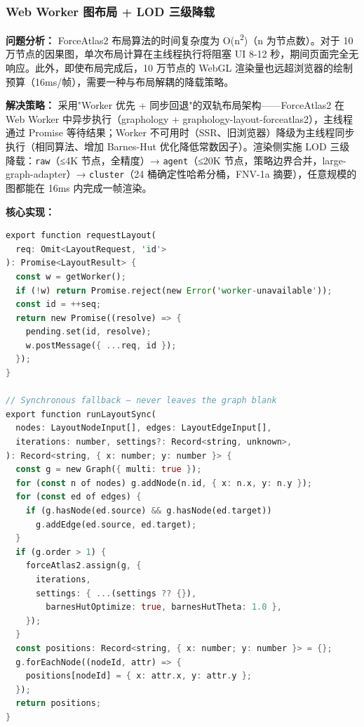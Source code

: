 \documentclass[a4paper]{ctexart}
\makeatletter
\renewcommand{\_}{%
  \ifmmode
    \nfss@text{\textunderscore}%
  \else
    \textunderscore\discretionary{}{}{}%
  \fi}
\makeatother
\begin{document}
\subsubsection{Web Worker 图布局 + LOD 三级降载}

\textbf{问题分析：} ForceAtlas2 布局算法的时间复杂度为 O(n\textsuperscript{2})（n 为节点数）。对于 10 万节点的因果图，单次布局计算在主线程执行将阻塞 UI 8-12 秒，期间页面完全无响应。此外，即使布局完成后，10 万节点的 WebGL 渲染量也远超浏览器的绘制预算（16ms/帧），需要一种与布局解耦的降载策略。

\textbf{解决策略：} 采用"Worker 优先 + 同步回退"的双轨布局架构——ForceAtlas2 在 Web Worker 中异步执行（graphology + graphology-layout-forceatlas2），主线程通过 Promise 等待结果；Worker 不可用时（SSR、旧浏览器）降级为主线程同步执行（相同算法、增加 Barnes-Hut 优化降低常数因子）。渲染侧实施 LOD 三级降载：\texttt{raw}（≤4K 节点，全精度）→ \texttt{agent}（≤20K 节点，策略边界合并，large-graph-adapter）→ \texttt{cluster}（24 桶确定性哈希分桶，FNV-1a 摘要），任意规模的图都能在 16ms 内完成一帧渲染。

\textbf{核心实现：}

\begin{lstlisting}[language={Rust}, caption={// frontend/lib/layout-worker-client.ts — Worker 优先图布局 + 同步回退}]
export function requestLayout(
  req: Omit<LayoutRequest, 'id'>
): Promise<LayoutResult> {
  const w = getWorker();
  if (!w) return Promise.reject(new Error('worker-unavailable'));
  const id = ++seq;
  return new Promise((resolve) => {
    pending.set(id, resolve);
    w.postMessage({ ...req, id });
  });
}

// Synchronous fallback — never leaves the graph blank
export function runLayoutSync(
  nodes: LayoutNodeInput[], edges: LayoutEdgeInput[],
  iterations: number, settings?: Record<string, unknown>,
): Record<string, { x: number; y: number }> {
  const g = new Graph({ multi: true });
  for (const n of nodes) g.addNode(n.id, { x: n.x, y: n.y });
  for (const ed of edges) {
    if (g.hasNode(ed.source) && g.hasNode(ed.target))
      g.addEdge(ed.source, ed.target);
  }
  if (g.order > 1) {
    forceAtlas2.assign(g, {
      iterations,
      settings: { ...(settings ?? {}),
        barnesHutOptimize: true, barnesHutTheta: 1.0 },
    });
  }
  const positions: Record<string, { x: number; y: number }> = {};
  g.forEachNode((nodeId, attr) => {
    positions[nodeId] = { x: attr.x, y: attr.y };
  });
  return positions;
}
\end{lstlisting}
\end{document}
